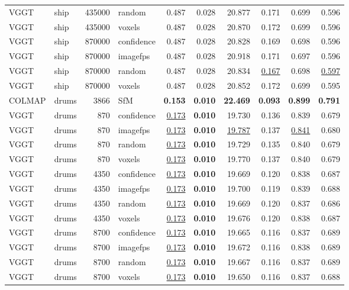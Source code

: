 \begin{table}[H]
\begin{tabular}{llrlrrrrrr}
VGGT & ship & 435000 & random & 0.487 & 0.028 & 20.877 & 0.171 & 0.699 & 0.596 \\
VGGT & ship & 435000 & voxels & 0.487 & 0.028 & 20.870 & 0.172 & 0.699 & 0.596 \\
VGGT & ship & 870000 & confidence & 0.487 & 0.028 & 20.828 & 0.169 & 0.698 & 0.596 \\
VGGT & ship & 870000 & imagefps & 0.487 & 0.028 & 20.918 & 0.171 & 0.697 & 0.596 \\
VGGT & ship & 870000 & random & 0.487 & 0.028 & 20.834 & \underline{0.167} & 0.698 & \underline{0.597} \\
VGGT & ship & 870000 & voxels & 0.487 & 0.028 & 20.852 & 0.172 & 0.699 & 0.595 \\
\midrule
COLMAP & drums & 3866 & SfM & \textbf{0.153} & \textbf{0.010} & \textbf{22.469} & \textbf{0.093} & \textbf{0.899} & \textbf{0.791} \\
VGGT & drums & 870 & confidence & \underline{0.173} & \textbf{0.010} & 19.730 & 0.136 & 0.839 & 0.679 \\
VGGT & drums & 870 & imagefps & \underline{0.173} & \textbf{0.010} & \underline{19.787} & 0.137 & \underline{0.841} & 0.680 \\
VGGT & drums & 870 & random & \underline{0.173} & \textbf{0.010} & 19.729 & 0.135 & 0.840 & 0.679 \\
VGGT & drums & 870 & voxels & \underline{0.173} & \textbf{0.010} & 19.770 & 0.137 & 0.840 & 0.679 \\
VGGT & drums & 4350 & confidence & \underline{0.173} & \textbf{0.010} & 19.669 & 0.120 & 0.838 & 0.687 \\
VGGT & drums & 4350 & imagefps & \underline{0.173} & \textbf{0.010} & 19.700 & 0.119 & 0.839 & 0.688 \\
VGGT & drums & 4350 & random & \underline{0.173} & \textbf{0.010} & 19.669 & 0.120 & 0.837 & 0.686 \\
VGGT & drums & 4350 & voxels & \underline{0.173} & \textbf{0.010} & 19.676 & 0.120 & 0.838 & 0.687 \\
VGGT & drums & 8700 & confidence & \underline{0.173} & \textbf{0.010} & 19.665 & 0.116 & 0.837 & 0.689 \\
VGGT & drums & 8700 & imagefps & \underline{0.173} & \textbf{0.010} & 19.672 & 0.116 & 0.838 & 0.689 \\
VGGT & drums & 8700 & random & \underline{0.173} & \textbf{0.010} & 19.667 & 0.116 & 0.837 & 0.689 \\
VGGT & drums & 8700 & voxels & \underline{0.173} & \textbf{0.010} & 19.650 & 0.116 & 0.837 & 0.688 \\

\end{tabular}
\end{table}
